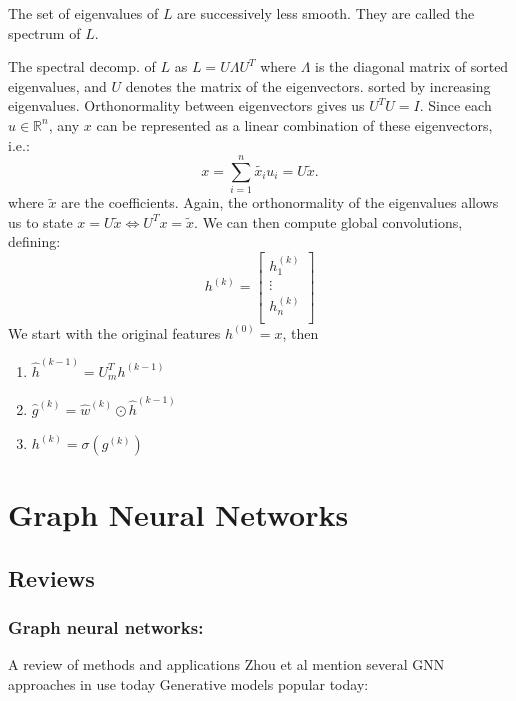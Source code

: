\documentclass[12pt]{article}
\begin{document}
The set of eigenvalues of \(L\) are successively less smooth. They are called the spectrum of \(L\).

The spectral decomp. of \(L\) as \(L=U\Lambda U^T\) where \(\Lambda\) is the
diagonal matrix of sorted eigenvalues, and \(U\) denotes the matrix of the
eigenvectors. sorted by increasing eigenvalues. Orthonormality between
eigenvectors gives us \(U^T U = I\). Since each \(u\in\mathbb{R}^n\), any \(x\)
can be represented as a linear combination of these eigenvectors, i.e.:
\begin{equation*}
x = \sum_{i=1}^{n}\widetilde{x_i}u_i=U\widetilde{x}.
\end{equation*}
where \(\widetilde{x}\) are the coefficients. Again, the orthonormality of the eigenvalues allows us to state \(x=U\widetilde{x} \iff U^Tx=\widetilde{x}\).
We can then compute global convolutions, defining:
    \begin{equation*}
h^{(k)} =
\begin{bmatrix}
h^{(k)}_1\\
\vdots\\
h^{(k)}_n\\
\end{bmatrix}
    \end{equation*}
We start with the original features \(h^{(0)}=x\), then
\begin{enumerate}
\item \(\hat{h}^{(k-1)} = U_m^Th^{(k-1)}\)
\item \(\hat{g}^{(k)}=\hat{w}^{(k)}\odot\hat{h}^{(k-1)}\)
\item \(h^{(k)}=\sigma(g^{(k)})\)
\end{enumerate}

\section{Graph Neural Networks}
\label{sec:org8b5968b}
\subsection{Reviews}
\label{sec:orgb03f3f2}
\subsubsection{Graph neural networks:}
\label{sec:org87f95e1}
    A review of methods and applications
Zhou et al mention several GNN approaches in use today
Generative models popular today:
\end{document}
